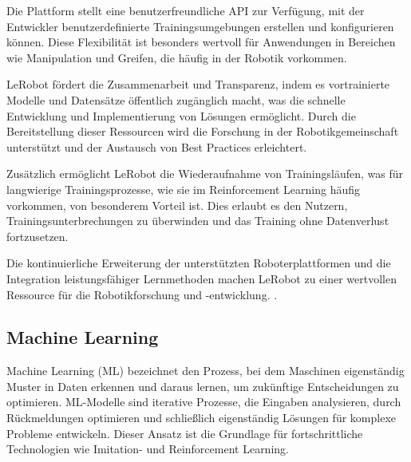\documentclass[a4paper, 12pt]{article}
\begin{document}
Die Plattform stellt eine benutzerfreundliche API zur Verfügung, mit der Entwickler benutzerdefinierte Trainingsumgebungen erstellen und konfigurieren können. Diese Flexibilität ist besonders wertvoll für Anwendungen in Bereichen wie Manipulation und Greifen, die häufig in der Robotik vorkommen.

LeRobot fördert die Zusammenarbeit und Transparenz, indem es vortrainierte Modelle und Datensätze öffentlich zugänglich macht, was die schnelle Entwicklung und Implementierung von Lösungen ermöglicht. Durch die Bereitstellung dieser Ressourcen wird die Forschung in der Robotikgemeinschaft unterstützt und der Austausch von Best Practices erleichtert.

Zusätzlich ermöglicht LeRobot die Wiederaufnahme von Trainingsläufen, was für langwierige Trainingsprozesse, wie sie im Reinforcement Learning häufig vorkommen, von besonderem Vorteil ist. Dies erlaubt es den Nutzern, Trainingsunterbrechungen zu überwinden und das Training ohne Datenverlust fortzusetzen.

Die kontinuierliche Erweiterung der unterstützten Roboterplattformen und die Integration leistungsfähiger Lernmethoden machen LeRobot zu einer wertvollen Ressource für die Robotikforschung und -entwicklung. \cite{cadene2024lerobot}.


\subsection{Machine Learning} \label{machine_learning}
Machine Learning (ML) bezeichnet den Prozess, bei dem Maschinen eigenständig Muster in Daten erkennen und daraus lernen, um zukünftige Entscheidungen zu optimieren. ML-Modelle sind iterative Prozesse, die Eingaben analysieren, durch Rückmeldungen optimieren und schließlich eigenständig Lösungen für komplexe Probleme entwickeln. Dieser Ansatz ist die Grundlage für fortschrittliche Technologien wie Imitation- und Reinforcement Learning. \cite{grundlagen_sw_entwicklung} 
\end{document}
